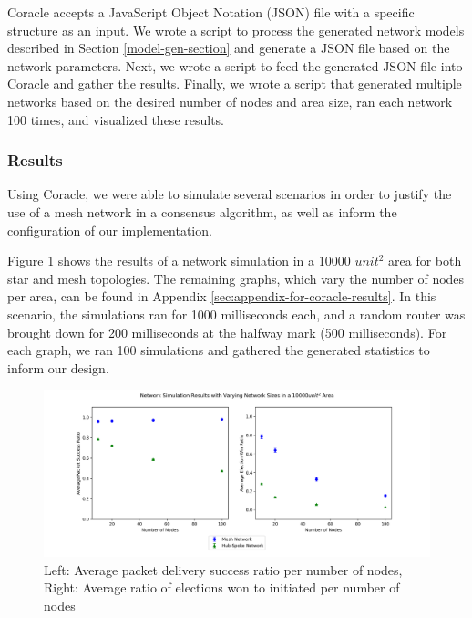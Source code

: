 Coracle accepts a JavaScript Object Notation (JSON) file with a specific structure as an input. We wrote a  script to process the generated network models described in Section \ref{model-gen-section} and generate a JSON file based on the network parameters. Next, we wrote a  script to feed the generated JSON file into Coracle and gather the results. Finally, we wrote a  script that generated multiple networks based on the desired number of nodes and area size, ran each network 100 times, and visualized these results.

\subsubsection{Results}
\label{sec:coracle_results}

Using Coracle, we were able to simulate several scenarios in order to justify the use of a mesh network in a consensus algorithm, as well as inform the configuration of our implementation. 

Figure \ref{fig:simulation_result_100} shows the results of a network simulation in a 10000 $unit^2$ area for both star and mesh topologies. The remaining graphs, which vary the number of nodes per area, can be found in Appendix \ref{sec:appendix-for-coracle-results}. In this scenario, the simulations ran for 1000 milliseconds each, and a random router was brought down for 200 milliseconds at the halfway mark (500 milliseconds). For each graph, we ran 100 simulations and gathered the generated statistics to inform our design.

\begin{figure}[H]
    \centering
    \includegraphics[width=0.9\columnwidth]{images/100unit^2.png}
    \caption{Left: Average packet delivery success ratio per number of nodes, Right: Average ratio of elections won to initiated per number of nodes }
    \label{fig:simulation_result_100}
\end{figure}

